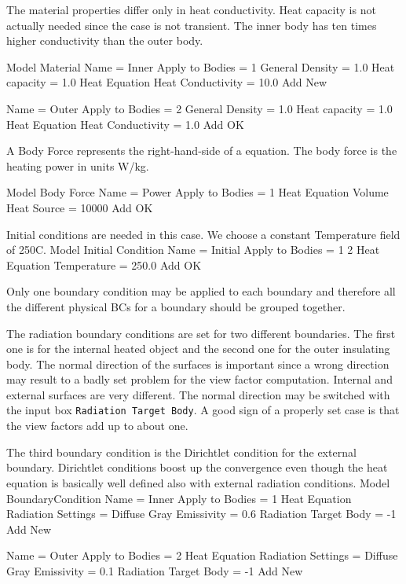 The material properties differ only in heat conductivity. Heat capacity is not
actually needed since the case is not transient. The inner body has ten times
higher conductivity than the outer body.

\ttbegin
Model
  Material
    Name = Inner
    Apply to Bodies = 1 
    General 
      Density = 1.0
      Heat capacity = 1.0
    Heat Equation
      Heat Conductivity = 10.0
    Add
    New

    Name = Outer
    Apply to Bodies = 2 
    General 
      Density = 1.0
      Heat capacity = 1.0
    Heat Equation
      Heat Conductivity = 1.0
    Add
    OK
\ttend

A Body Force represents the right-hand-side of a equation. The body 
force is the heating power in units W/kg. 
 

\ttbegin
Model
  Body Force
    Name = Power
    Apply to Bodies = 1
    Heat Equation
       Volume Heat Source = 10000
    Add 
    OK
\ttend    

Initial conditions are needed in this case. We choose a 
constant Temperature field of 250C. 
\ttbegin
Model
  Initial Condition 
    Name = Initial
    Apply to Bodies = 1 2
    Heat Equation
      Temperature = 250.0
    Add 
    OK
\ttend

Only one boundary condition may be applied to each boundary and therefore all the 
different physical BCs for a boundary should be grouped together. 

The radiation boundary conditions are set for two different boundaries. The first one
is for the internal heated object and the second one for the outer insulating body. 
The normal direction of the surfaces is important since a wrong direction may 
result to a badly set problem for the view factor computation. Internal and 
external surfaces are very different.  The normal direction may be switched 
with the input box \texttt{Radiation Target Body}. A good sign of a properly 
set case is that the view factors add up to about one.

The third boundary condition is the Dirichtlet condition for the external boundary.
Dirichtlet conditions boost up the convergence even though the heat equation 
is basically well defined also with external radiation conditions.
\ttbegin
Model
  BoundaryCondition
    Name = Inner
    Apply to Bodies = 1
    Heat Equation
      Radiation Settings = Diffuse Gray
      Emissivity = 0.6
      Radiation Target Body = -1
    Add
    New

    Name = Outer
    Apply to Bodies = 2
    Heat Equation
      Radiation Settings = Diffuse Gray
      Emissivity = 0.1
      Radiation Target Body = -1
    Add 
    New

